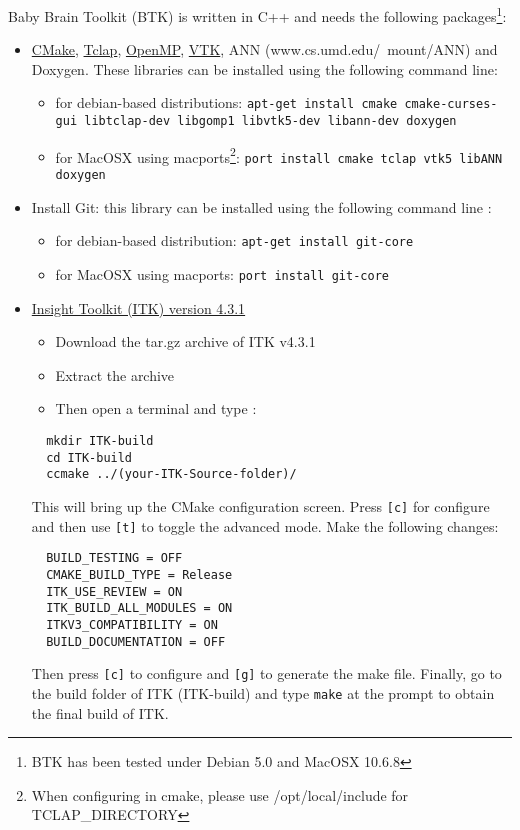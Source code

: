 \documentclass[a4paper,10pt]{article}
\begin{document}
  Baby Brain Toolkit (BTK) is written in C++ and needs the following packages\footnote{BTK has been tested under Debian 5.0 and MacOSX 10.6.8}:
  \begin{itemize}
  \item \href{http://www.cmake.org}{CMake}, \href{http://tclap.sourceforge.net}{Tclap}, \href{http://openmp.org}{OpenMP}, \href{http://www.vtk.org}{VTK}, ANN (www.cs.umd.edu/\string~mount/ANN) and Doxygen. These
  libraries can be installed using the following command line: 
  \begin{itemize}
  \item for debian-based distributions: \texttt{apt-get install cmake
  cmake-curses-gui libtclap-dev libgomp1 libvtk5-dev libann-dev doxygen}
  \item for MacOSX using macports\footnote{When configuring in cmake, please use /opt/local/include for TCLAP\_DIRECTORY}: \texttt{port install cmake tclap vtk5 libANN doxygen}
  \end{itemize}
  \item Install Git: this library can be installed using the following command line : 
  \begin{itemize}
  \item for debian-based distribution: \texttt{apt-get install git-core}
  \item for MacOSX using macports: \texttt{port install git-core}
  \end{itemize}
  \item \href{http://www.itk.org/ITK/resources/software.html}{Insight Toolkit (ITK) version 4.3.1}
  \begin{itemize}
  \item Download the tar.gz archive of ITK v4.3.1
  \item Extract the archive 
  \item Then open a terminal and type :
  \end{itemize}
  \begin{verbatim}
  mkdir ITK-build
  cd ITK-build
  ccmake ../(your-ITK-Source-folder)/
  \end{verbatim}
  This will bring up the CMake configuration screen. Press \texttt{[c]} for
  configure and then use \texttt{[t]} to toggle the advanced mode. Make the
  following changes:
  \begin{verbatim}
  BUILD_TESTING = OFF
  CMAKE_BUILD_TYPE = Release
  ITK_USE_REVIEW = ON
  ITK_BUILD_ALL_MODULES = ON
  ITKV3_COMPATIBILITY = ON
  BUILD_DOCUMENTATION = OFF
  \end{verbatim}
  Then press \texttt{[c]} to configure and \texttt{[g]} to generate the make file.
  Finally, go to the build folder of ITK (ITK-build) and type \texttt{make} at the prompt to obtain the final build of ITK.

  \end{itemize}
\end{document}
